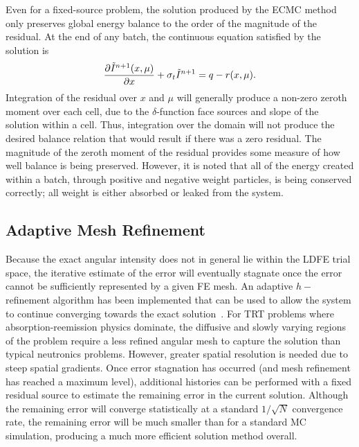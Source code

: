 Even for a fixed-source problem, the solution produced by the ECMC method only preserves
global energy balance to the order of the magnitude of the residual.  
At the end of any batch, the continuous equation satisfied by the solution is
\begin{equation}
    \frac{\partial \tilde I^{n+1}(x,\mu)}{\partial x} + \sigma_t \tilde I^{n+1} = q - r(x,\mu).
\end{equation}
Integration of the residual over $x$ and $\mu$ will generally produce a non-zero zeroth moment 
over each cell, due to the $\delta$-function face sources and slope of the solution within
a cell.  Thus, integration over the domain will not produce the desired balance
relation that would result if there was a zero residual.  The magnitude of the zeroth moment of
the residual provides some measure of how well balance is being preserved.  However, it is noted that all of the
energy created within a batch, through positive and negative weight particles, is being
conserved correctly; all weight is either absorbed or leaked from the system.

\subsection{Adaptive Mesh Refinement}

Because the exact angular intensity does not in general lie within the LDFE trial space, the
iterative estimate of the error will eventually stagnate once the error cannot be sufficiently
represented by a given FE mesh.  An adaptive $h-$refinement algorithm has been
implemented that can be used to allow the system to continue converging towards the
exact solution~\cite{jake,ans_2014}. For TRT problems where absorption-reemission physics dominate, the diffusive and slowly varying
regions of the problem require a less refined angular mesh to capture the solution than typical neutronics
problems.  However, greater spatial resolution is needed due to steep spatial
gradients.   
Once error stagnation has occurred (and mesh refinement has reached a maximum level),
additional histories can be performed with a
fixed residual source to estimate the remaining error in the current solution.  Although the remaining error will
converge statistically at a standard $1/\sqrt{N}$ convergence rate, the remaining
error will be much smaller than for a standard MC simulation, producing a much more
efficient solution method overall.


